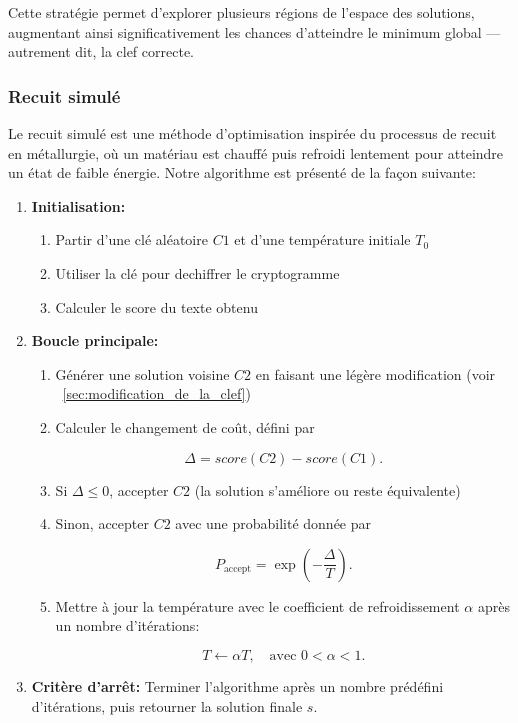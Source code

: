\documentclass[a4paper]{article}
\begin{document}
Cette stratégie permet d’explorer plusieurs régions de l’espace des solutions, augmentant ainsi significativement les chances d’atteindre le minimum global — autrement dit, la clef correcte.


\subsubsection{Recuit simulé}
Le recuit simulé est une méthode d’optimisation inspirée du processus de recuit en métallurgie, où un matériau est chauffé puis refroidi lentement pour atteindre un état de faible énergie.
Notre algorithme est présenté de la façon suivante:
\begin{enumerate}
    \item \textbf{Initialisation:} 
    \begin{enumerate}
        \item Partir d'une clé aléatoire $C1$ et d'une température initiale $T_0$
        \item Utiliser la clé pour dechiffrer le cryptogramme
        \item Calculer le score du texte obtenu
    \end{enumerate}
    \item \textbf{Boucle principale:}
    \begin{enumerate}[label= (\alph*)]
        \item Générer une solution voisine $C2$ en faisant une légère modification (voir ~\ref{sec:modification_de_la_clef})
        \item Calculer le changement de coût, défini par
        

        \[
            \Delta = score(C2) - score(C1).
        \]


        \item Si $\Delta \leq 0$, accepter $C2$ (la solution s'améliore ou reste équivalente)
        \item Sinon, accepter $C2$ avec une probabilité donnée par
        

        \[
            P_{\text{accept}} = \exp\left(-\frac{\Delta}{T}\right).
        \]


        \item Mettre à jour la température avec le coefficient de refroidissement $\alpha$ après un nombre d'itérations:
        

        \[
            T \leftarrow \alpha T, \quad \text{avec } 0 < \alpha < 1.
        \]


    \end{enumerate}
    
    \item \textbf{Critère d'arrêt:} Terminer l'algorithme après un nombre prédéfini d'itérations, puis retourner la solution finale $s$.
\end{enumerate}
\end{document}
